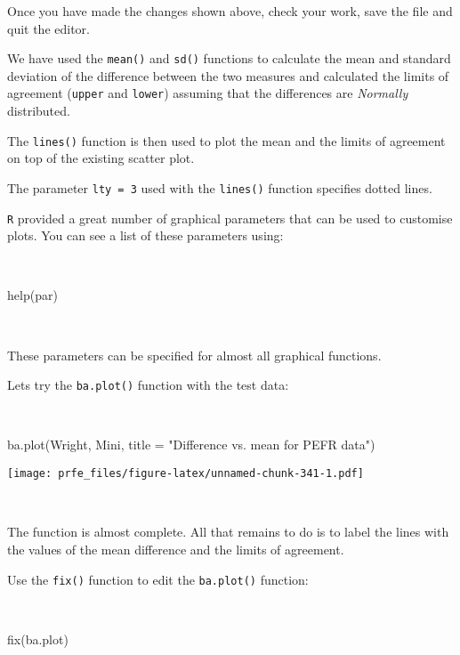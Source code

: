 \documentclass[
  12pt,
  a4paper]{book}
\newenvironment{Shaded}{\begin{snugshade}}{\end{snugshade}}
\newcommand{\AttributeTok}[1]{\textcolor[rgb]{0.77,0.63,0.00}{#1}}
\newcommand{\FunctionTok}[1]{\textcolor[rgb]{0.00,0.00,0.00}{#1}}
\newcommand{\NormalTok}[1]{#1}
\newcommand{\StringTok}[1]{\textcolor[rgb]{0.31,0.60,0.02}{#1}}
\begin{document}
Once you have made the changes shown above, check your work, save the file and quit the editor.

We have used the \texttt{mean()} and \texttt{sd()} functions to calculate the mean and standard deviation of the difference between the two measures and calculated the limits of agreement (\texttt{upper} and \texttt{lower}) assuming that the differences are \emph{Normally} distributed.

The \texttt{lines()} function is then used to plot the mean and the limits of agreement on top of the existing scatter plot.

The parameter \texttt{lty\ =\ 3} used with the \texttt{lines()} function specifies dotted lines.

\texttt{R} provided a great number of graphical parameters that can be used to customise plots. You can see a list of
these parameters using:

~

\begin{Shaded}
\begin{Highlighting}[]
\FunctionTok{help}\NormalTok{(par)}
\end{Highlighting}
\end{Shaded}

~

These parameters can be specified for almost all graphical functions.

Lets try the \texttt{ba.plot()} function with the test data:

~

\begin{Shaded}
\begin{Highlighting}[]
\FunctionTok{ba.plot}\NormalTok{(Wright, Mini, }\AttributeTok{title =} \StringTok{"Difference vs. mean for PEFR data"}\NormalTok{)}
\end{Highlighting}
\end{Shaded}

\texttt{[image: prfe\_files/figure-latex/unnamed-chunk-341-1.pdf]}

~

The function is almost complete. All that remains to do is to label the lines with the values of the mean difference and the limits of agreement.

Use the \texttt{fix()} function to edit the \texttt{ba.plot()} function:

~

\begin{Shaded}
\begin{Highlighting}[]
\FunctionTok{fix}\NormalTok{(ba.plot)}
\end{Highlighting}
\end{Shaded}
\end{document}
